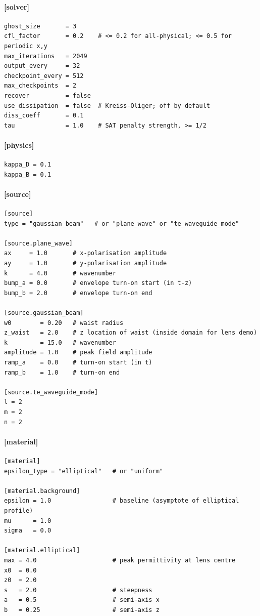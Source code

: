 \documentclass[11pt]{article}
\begin{document}
\paragraph{[solver]}
\begin{lstlisting}[style=shell]
ghost_size       = 3
cfl_factor       = 0.2    # <= 0.2 for all-physical; <= 0.5 for periodic x,y
max_iterations   = 2049
output_every     = 32
checkpoint_every = 512
max_checkpoints  = 2
recover          = false
use_dissipation  = false  # Kreiss-Oliger; off by default
diss_coeff       = 0.1
tau              = 1.0    # SAT penalty strength, >= 1/2
\end{lstlisting}

\paragraph{[physics]}
\begin{lstlisting}[style=shell]
kappa_D = 0.1
kappa_B = 0.1
\end{lstlisting}

\paragraph{[source]}
\begin{lstlisting}[style=shell]
[source]
type = "gaussian_beam"   # or "plane_wave" or "te_waveguide_mode"

[source.plane_wave]
ax     = 1.0       # x-polarisation amplitude
ay     = 1.0       # y-polarisation amplitude
k      = 4.0       # wavenumber
bump_a = 0.0       # envelope turn-on start (in t-z)
bump_b = 2.0       # envelope turn-on end

[source.gaussian_beam]
w0        = 0.20   # waist radius
z_waist   = 2.0    # z location of waist (inside domain for lens demo)
k         = 15.0   # wavenumber
amplitude = 1.0    # peak field amplitude
ramp_a    = 0.0    # turn-on start (in t)
ramp_b    = 1.0    # turn-on end

[source.te_waveguide_mode]
l = 2
m = 2
n = 2
\end{lstlisting}

\paragraph{[material]}
\begin{lstlisting}[style=shell]
[material]
epsilon_type = "elliptical"   # or "uniform"

[material.background]
epsilon = 1.0                 # baseline (asymptote of elliptical profile)
mu      = 1.0
sigma   = 0.0

[material.elliptical]
max = 4.0                     # peak permittivity at lens centre
x0  = 0.0
z0  = 2.0
s   = 2.0                     # steepness
a   = 0.5                     # semi-axis x
b   = 0.25                    # semi-axis z
\end{lstlisting}
\end{document}
